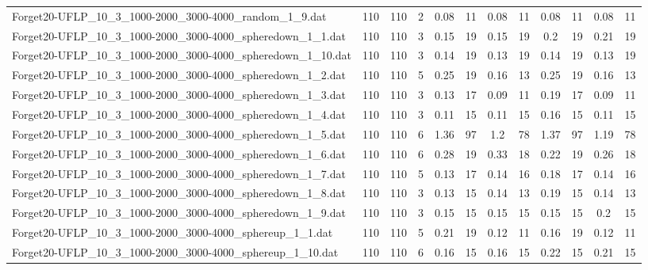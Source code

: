 \begin{sidewaystable}[!ht]
{\begin{tabular}{lccccccccccc}
Forget20-UFLP\_10\_3\_1000-2000\_3000-4000\_random\_1\_9.dat & 110 & 110 & 2 &  \textcolor{blue2}{0.08} & 11 &  \textcolor{blue2}{0.08} & 11 &  \textcolor{blue2}{0.08} & 11 &  \textcolor{blue2}{0.08} & 11 \\
Forget20-UFLP\_10\_3\_1000-2000\_3000-4000\_spheredown\_1\_1.dat & 110 & 110 & 3 & 0.15 & 19 & 0.15 & 19 & 0.2 & 19 & 0.21 & 19 \\
Forget20-UFLP\_10\_3\_1000-2000\_3000-4000\_spheredown\_1\_10.dat & 110 & 110 & 3 & 0.14 & 19 &  \textcolor{blue2}{0.13} & 19 & 0.14 & 19 &  \textcolor{blue2}{0.13} & 19 \\
Forget20-UFLP\_10\_3\_1000-2000\_3000-4000\_spheredown\_1\_2.dat & 110 & 110 & 5 & 0.25 & 19 &  \textcolor{blue2}{0.16} & 13 & 0.25 & 19 &  \textcolor{blue2}{0.16} & 13 \\
Forget20-UFLP\_10\_3\_1000-2000\_3000-4000\_spheredown\_1\_3.dat & 110 & 110 & 3 & 0.13 & 17 &  \textcolor{blue2}{0.09} & 11 & 0.19 & 17 &  \textcolor{blue2}{0.09} & 11 \\
Forget20-UFLP\_10\_3\_1000-2000\_3000-4000\_spheredown\_1\_4.dat & 110 & 110 & 3 &  \textcolor{blue2}{0.11} & 15 &  \textcolor{blue2}{0.11} & 15 & 0.16 & 15 &  \textcolor{blue2}{0.11} & 15 \\
Forget20-UFLP\_10\_3\_1000-2000\_3000-4000\_spheredown\_1\_5.dat & 110 & 110 & 6 & 1.36 & 97 & 1.2 & 78 & 1.37 & 97 &  \textcolor{blue2}{1.19} & 78 \\
Forget20-UFLP\_10\_3\_1000-2000\_3000-4000\_spheredown\_1\_6.dat & 110 & 110 & 6 & 0.28 & 19 & 0.33 & 18 &  \textcolor{blue2}{0.22} & 19 & 0.26 & 18 \\
Forget20-UFLP\_10\_3\_1000-2000\_3000-4000\_spheredown\_1\_7.dat & 110 & 110 & 5 & 0.13 & 17 & 0.14 & 16 & 0.18 & 17 & 0.14 & 16 \\
Forget20-UFLP\_10\_3\_1000-2000\_3000-4000\_spheredown\_1\_8.dat & 110 & 110 & 3 &  \textcolor{blue2}{0.13} & 15 & 0.14 & 13 & 0.19 & 15 & 0.14 & 13 \\
Forget20-UFLP\_10\_3\_1000-2000\_3000-4000\_spheredown\_1\_9.dat & 110 & 110 & 3 &  \textcolor{blue2}{0.15} & 15 &  \textcolor{blue2}{0.15} & 15 &  \textcolor{blue2}{0.15} & 15 & 0.2 & 15 \\
Forget20-UFLP\_10\_3\_1000-2000\_3000-4000\_sphereup\_1\_1.dat & 110 & 110 & 5 & 0.21 & 19 &  \textcolor{blue2}{0.12} & 11 & 0.16 & 19 &  \textcolor{blue2}{0.12} & 11 \\
Forget20-UFLP\_10\_3\_1000-2000\_3000-4000\_sphereup\_1\_10.dat & 110 & 110 & 6 &  \textcolor{blue2}{0.16} & 15 &  \textcolor{blue2}{0.16} & 15 & 0.22 & 15 & 0.21 & 15 \\

\end{tabular}}
\end{sidewaystable}
